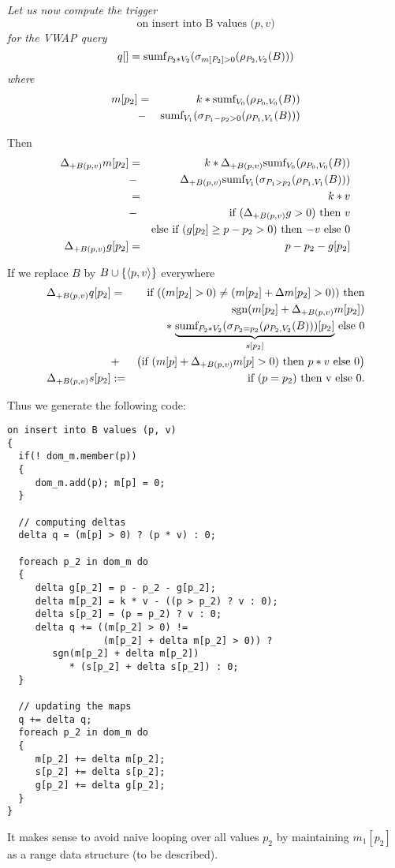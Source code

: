 \begin{example}\em
Let us now compute the trigger
\[
\mbox{on insert into B values ($p, v$)}
\]
for the VWAP query
\[
q[] = \mbox{sumf}_{P_2 * V_2}(\sigma_{m[P_2] > 0}(\rho_{P_2, V_2}(B)))
\]
where
\begin{eqnarray*}
m[p_2] &=&  k * \mbox{sumf}_{V_0}(\rho_{P_0, V_0}(B))   \\
       &-&  \mbox{sumf}_{V_1}(\sigma_{P_1 - p_2 > 0}(\rho_{P_1, V_1}(B)))
\end{eqnarray*}

Then
\begin{eqnarray*}
\Delta_{+B(p,v)} m[p_2] &=&
            k * \Delta_{+B(p,v)} \mbox{sumf}_{V_0}(\rho_{P_0, V_0}(B))   \\
       &-&  \Delta_{+B(p,v)} \mbox{sumf}_{V_1}(\sigma_{P_1 > p_2}(\rho_{P_1, V_1}(B)))
\\
&=& k * v \\
&-& \mbox{if $(\Delta_{+B(p,v)} g > 0)$ then $v$} \\
& & \mbox{else if $(g[p_2] \ge p-p_2 > 0)$ then $-v$ else 0}
\\
\Delta_{+B(p,v)} g[p_2] &=& p - p_2 - g[p_2]
\end{eqnarray*}



If we replace $B$ by $B \cup \{{\langle p, v\rangle}\}$ everywhere
\begin{eqnarray*}
\Delta_{+B(p,v)} q[p_2] &=&
\mbox{if ($(m[p_2] > 0) \neq (m[p_2] + \Delta m[p_2] > 0))$ then}
\\
&& ~~~
      \mbox{sgn}(m[p_2] + \Delta_{+B(p,v)} m[p_2]) \\
&& ~~~ * \;  \mbox{$\underbrace{\mbox{sumf}_{P_2 * V_2}(\sigma_{P_2=p_2}(\rho_{P_2,V_2}(B)))[p_2]}_{s[p_2]}$ else 0}
\\
&+&
\big( \mbox{if $(m[p] + \Delta_{+B(p,v)} m[p] > 0)$ then $p * v$ else $0$} \big)
\\
\Delta_{+B(p,v)} s[p_2] &:=& \mbox{if $(p = p_2)$ then v else 0}.
\end{eqnarray*}

Thus we generate the following code:
\begin{verbatim}
on insert into B values (p, v)
{
  if(! dom_m.member(p))
  {
     dom_m.add(p); m[p] = 0;
  }

  // computing deltas
  delta q = (m[p] > 0) ? (p * v) : 0;

  foreach p_2 in dom_m do
  {
     delta g[p_2] = p - p_2 - g[p_2];
     delta m[p_2] = k * v - ((p > p_2) ? v : 0);
     delta s[p_2] = (p = p_2) ? v : 0;
     delta q += ((m[p_2] > 0) !=
                 (m[p_2] + delta m[p_2] > 0)) ?
        sgn(m[p_2] + delta m[p_2])
           * (s[p_2] + delta s[p_2]) : 0;
  }

  // updating the maps
  q += delta q;
  foreach p_2 in dom_m do
  {
     m[p_2] += delta m[p_2];
     s[p_2] += delta s[p_2];
     g[p_2] += delta g[p_2];
  }
}
\end{verbatim}


It makes sense to avoid naive looping over all values $p_2$ by maintaining
$m_1[p_2]$ as a range data structure (to be described).
\punto
\end{example}
